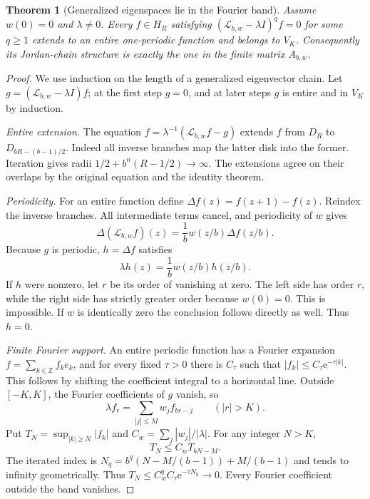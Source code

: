 \documentclass[11pt,a4paper]{article}
\newtheorem{theorem}{Theorem}[section]
\theoremstyle{definition}
\theoremstyle{remark}
\newcommand{\Z}{\mathbb Z}
\newcommand{\e}{\mathrm e}
\newcommand{\Lop}{\mathcal L}
\numberwithin{equation}{section}
\begin{document}
\begin{theorem}[Generalized eigenspaces lie in the Fourier band]
\label{thm:generalized-band}
Assume $w(0)=0$ and $\lambda\ne0$. Every $f\in H_R$ satisfying
$(\Lop_{b,w}-\lambda I)^qf=0$ for some $q\ge1$ extends to an entire
one-periodic function and belongs to $V_K$. Consequently its Jordan-chain
structure is exactly the one in the finite matrix $A_{b,w}$.
\end{theorem}
\begin{proof}
We use induction on the length of a generalized eigenvector chain. Let
$g=(\Lop_{b,w}-\lambda I)f$; at the first step $g=0$, and at later steps
$g$ is entire and in $V_K$ by induction.

\emph{Entire extension.} The equation
$f=\lambda^{-1}(\Lop_{b,w}f-g)$ extends $f$ from $D_R$ to
$D_{bR-(b-1)/2}$. Indeed all inverse branches map the latter disk into the
former. Iteration gives radii $1/2+b^n(R-1/2)\to\infty$.
The extensions agree on their overlaps by the original equation and the
identity theorem.

\emph{Periodicity.} For an entire function define
$\Delta f(z)=f(z+1)-f(z)$. Reindex the inverse branches. All intermediate
terms cancel, and periodicity of $w$ gives
\begin{equation}
 \Delta(\Lop_{b,w}f)(z)=\frac1b w(z/b)\Delta f(z/b).
 \label{eq:boundaryintertwine}
\end{equation}
Because $g$ is periodic, $h=\Delta f$ satisfies
\[
 \lambda h(z)=\frac1b w(z/b)h(z/b).
\]
If $h$ were nonzero, let $r$ be its order of vanishing at zero. The left side
has order $r$, while the right side has strictly greater order because
$w(0)=0$. This is impossible. If $w$ is identically zero the conclusion
follows directly as well. Thus $h=0$.

\emph{Finite Fourier support.} An entire periodic function has a Fourier
expansion $f=\sum_{k\in\Z}f_ke_k$, and for every fixed $\tau>0$ there is
$C_\tau$ such that $|f_k|\le C_\tau\e^{-\tau|k|}$. This follows by shifting
the coefficient integral to a horizontal line. Outside $[-K,K]$, the
Fourier coefficients of $g$ vanish, so
\begin{equation}
 \lambda f_r=\sum_{|j|\le M}w_j f_{br-j}\qquad(|r|>K).
 \label{eq:tailrecursion}
\end{equation}
Put $T_N=\sup_{|k|\ge N}|f_k|$ and $C_w=\sum_j|w_j|/|\lambda|$.
For any integer $N>K$,
\[
 T_N\le C_wT_{bN-M}.
\]
The iterated index is
$N_q=b^q(N-M/(b-1))+M/(b-1)$ and tends to infinity geometrically.
Thus $T_N\le C_w^qC_\tau\e^{-\tau N_q}\to0$.
Every Fourier coefficient outside the band vanishes.
\end{proof}
\end{document}
